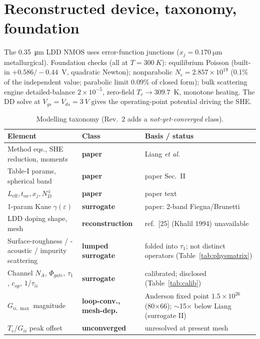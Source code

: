 \documentclass[11pt]{article}
\newcommand{\eps}{\varepsilon}
\begin{document}
\section{Reconstructed device, taxonomy, foundation}\label{sec:device}
The \SI{0.35}{\micro\meter} LDD NMOS uses error-function junctions ($x_j=\SI{0.170}{\micro
\meter}$ metallurgical). Foundation checks (all at $T=\SI{300}{K}$): equilibrium Poisson (built-in
$+0.586/-0.44$~V, quadratic Newton); nonparabolic $N_c=2.857\times10^{19}$ (0.1\% of the
independent value; parabolic limit 0.09\% of closed form); bulk scattering engine
detailed-balance $2\times10^{-5}$, zero-field $T_e\to309.7$~K, monotone heating. The DD solve
at $V_{gs}=V_{ds}=\SI{3}{V}$ gives the operating-point potential driving the SHE.

\begin{table}[h]\centering\small
\caption{Modelling taxonomy (Rev.~2 adds a \emph{not-yet-converged} class).}\label{tab:taxonomy}
\begin{tabular}{p{5.4cm}p{3.0cm}p{5.8cm}}
\toprule
Element & Class & Basis / status \\
\midrule
Method eqs., SHE reduction, moments & \textbf{paper} & Liang \emph{et al.} \\
Table-I params, spherical band & \textbf{paper} & paper Sec.~II \\
$L_{\text{eff}},t_{ox},x_j,N_D^\pm$ & \textbf{paper} & paper text \\
1-param Kane $\gamma(\eps)$ & \textbf{surrogate} & paper: 2-band Fiegna/Brunetti \\
LDD doping shape, mesh & \textbf{reconstruction} & ref.~[25] (Khalil 1994) unavailable \\
Surface-roughness / -acoustic / impurity scattering & \textbf{lumped surrogate} & folded into $\tau_1$; not distinct operators (Table~\ref{tab:physmatrix}) \\
Channel $N_A$, $\Phi_{gate}$, $\tau_1$, $c_{op}$, $1/\tau_{ii}$ & \textbf{surrogate} & calibrated; disclosed (Table~\ref{tab:calib}) \\
$G_{ii,\max}$ magnitude & \textbf{loop-conv., mesh-dep.} & Anderson fixed point $1.5\times10^{26}$ (80$\times$66); $\sim$15$\times$ below Liang (surrogate II) \\
$T_e$/$G_{ii}$ peak offset & \textbf{unconverged} & unresolved at present mesh \\
\bottomrule
\end{tabular}
\end{table}
\end{document}
